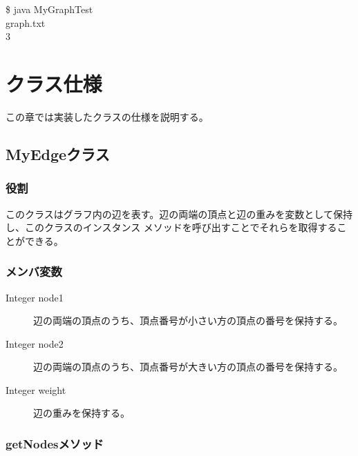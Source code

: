 \documentclass[a4j]{jarticle}
\begin{document}
\begin{screen}
\$ java MyGraphTest \\
graph.txt  \\
3
\end{screen}

\section{クラス仕様}
この章では実装したクラスの仕様を説明する。

\subsection{MyEdgeクラス}

\subsubsection{役割}
このクラスはグラフ内の辺を表す。辺の両端の頂点と辺の重みを変数として保持し、このクラスのインスタンス
メソッドを呼び出すことでそれらを取得することができる。

\subsubsection{メンバ変数}

\begin{description}
\item[Integer node1]
辺の両端の頂点のうち、頂点番号が小さい方の頂点の番号を保持する。

\item[Integer node2]
辺の両端の頂点のうち、頂点番号が大きい方の頂点の番号を保持する。

\item[Integer weight]
辺の重みを保持する。

\end{description}

\subsubsection{getNodesメソッド}
\end{document}
